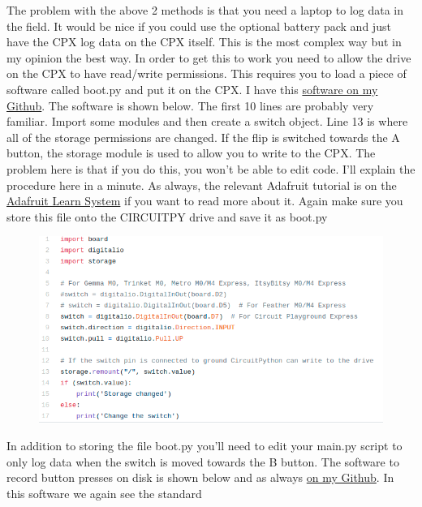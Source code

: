The problem with the above 2 methods is that you need a laptop to log
data in the field. It would be nice if you could use the optional
battery pack and just have the CPX log data on the CPX itself. This is
the most complex way but in my opinion the best way. In order to get
this to work you need to allow the drive on the CPX to have read/write
permissions. This requires you to load a piece of software called
boot.py and put it on the CPX. I have this
\href{https://github.com/cmontalvo251/Microcontrollers/blob/master/Circuit_Playground/CircuitPython/Data_Logging/boot.py}{software
  on my Github}. The software is shown below. The first 10 lines are
probably very familiar. Import some modules and then create a switch object. Line 13
is where all of the storage permissions are changed. If the flip is
switched towards the A button, the storage module is used to allow you
to write to the CPX. The problem here is that if you do this, you
won’t be able to edit code. I’ll explain the procedure here in a
minute. As always, the relevant Adafruit tutorial is on the \href{https://learn.adafruit.com/adafruit-circuit-playground-express/circuitpython-storage}{Adafruit
Learn System} if you want to read more about it. Again make sure you
store this file onto the CIRCUITPY drive and save it as boot.py
\begin{figure}[H]
  \begin{center}
    \includegraphics[width=\textwidth]{Figures/boot.png}
  \end{center}
\end{figure}
In addition to storing the file boot.py you’ll need to edit your
main.py script to only log data when the switch is moved towards the B
button. The software to record button presses on disk is shown below
and as always
\href{https://github.com/cmontalvo251/Microcontrollers/blob/master/Circuit_Playground/CircuitPython/Data_Logging/write_button_presses_disk.py}{on
  my Github}. In this software we again see the standard 

